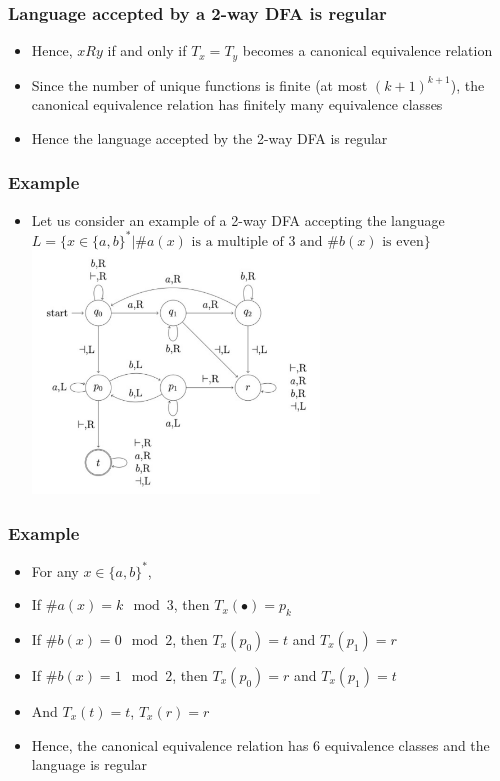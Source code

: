 \documentclass{beamer}
\begin{document}
\begin{frame}
\frametitle{Language accepted by a 2-way DFA is regular}
\begin{itemize}
\item Hence, $xRy$ if and only if $T_x = T_y$ becomes a canonical equivalence relation
\item Since the number of unique functions is finite (at most $(k+1)^{k+1}$), the canonical equivalence relation has finitely many equivalence classes
\item Hence the language accepted by the 2-way DFA is regular
\end{itemize}
\end{frame}

\begin{frame}
\frametitle{Example}
\begin{itemize}
\item Let us consider an example of a 2-way DFA accepting the language $L = \{x\in\{a,b\}^* | \#a(x) \text{ is a multiple of 3 and } \#b(x) \text{ is even}\}$
\includegraphics[width=0.6\textwidth]{dfa4.pdf}
\end{itemize}
\end{frame}

\begin{frame}
\frametitle{Example}
\begin{itemize}
\item For any $x\in\{a,b\}^*$,
\item If $\#a(x) = k \mod 3$, then $T_x(\bullet) = p_k$
\item If $\#b(x) = 0 \mod 2$, then $T_x(p_0) = t$ and $T_x(p_1) = r$
\item If $\#b(x) = 1 \mod 2$, then $T_x(p_0) = r$ and $T_x(p_1) = t$
\item And $T_x(t) = t$, $T_x(r) = r$
\item Hence, the canonical equivalence relation has 6 equivalence classes and the language is regular
\end{itemize}
\end{frame}
\end{document}
